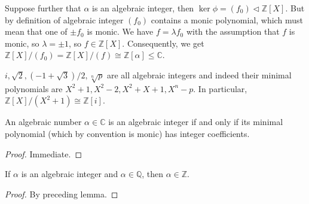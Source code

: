 Suppose further that $\alpha$ is an algebraic integer, then $\ker\phi=(f_0)\lhd\mathbb Z[X]$.
But by definition of algebraic integer $(f_0)$ contains a monic polynomial, which must mean that one of $\pm f_0$ is monic.
We have $f=\lambda f_0$ with the assumption that $f$ is monic, so $\lambda=\pm 1$, so $f\in\mathbb Z[X]$.
Consequently, we get $\mathbb Z[X]/(f_0)=\mathbb Z[X]/(f)\cong \mathbb Z[\alpha]\le\mathbb C$.
\begin{example}
    $i,\sqrt{2},(-1+\sqrt{3})/2,\sqrt[n]{p}$ are all algebraic integers and indeed their minimal polynomials are $X^2+1,X^2-2,X^2+X+1,X^n-p$.
    In particular, $\mathbb Z[X]/(X^2+1)\cong\mathbb Z[i]$.
\end{example}
\begin{lemma}
    An algebraic number $\alpha\in\mathbb C$ is an algebraic integer if and only if its minimal polynomial (which by convention is monic) has integer coefficients.
\end{lemma}
\begin{proof}
    Immediate.
\end{proof}
\begin{corollary}
    If $\alpha$ is an algebraic integer and $\alpha\in\mathbb Q$, then $\alpha\in\mathbb Z$.
\end{corollary}
\begin{proof}
    By preceding lemma.
\end{proof}
